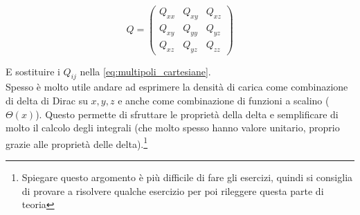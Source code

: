 \begin{equation}
Q = 
\begin{pmatrix}
    Q_{xx} & Q_{xy} & Q_{xz} \\
    Q_{xy} & Q_{yy} & Q_{yz} \\
    Q_{xz} & Q_{yz} & Q_{zz}
\end{pmatrix}
\end{equation}

E sostituire i $Q_{ij}$ nella \ref{eq:multipoli_cartesiane}. \\

Spesso è molto utile andare ad esprimere la densità di carica come combinazione di delta di Dirac su $x,y,z$ e anche come combinazione di funzioni a scalino ($\Theta(x)$). Questo permette di sfruttare le proprietà della delta e semplificare di molto il calcolo degli integrali (che molto spesso hanno valore unitario, proprio grazie alle proprietà delle delta).\footnote{Spiegare questo argomento è più difficile di fare gli esercizi, quindi si consiglia di provare a risolvere qualche esercizio per poi rileggere questa parte di teoria}

